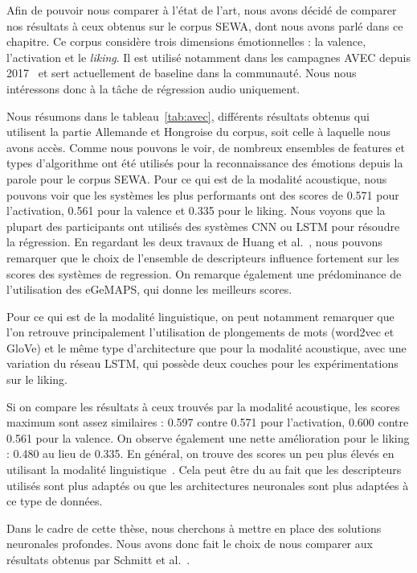 Afin de pouvoir nous comparer à l'état de l'art, nous avons décidé de comparer nos résultats à ceux obtenus sur le corpus SEWA, dont nous avons parlé dans ce chapitre.
Ce corpus considère trois dimensions émotionnelles : la valence, l'activation et le \textit{liking}. Il est utilisé notamment dans les campagnes AVEC depuis 2017~\cite{AVEC2017,AVEC2018,AVEC2019} et sert actuellement de baseline dans la communauté. Nous nous intéressons donc à la tâche de régression audio uniquement.

Nous résumons dans le tableau~\ref{tab:avec}, différents résultats obtenus qui utilisent la partie Allemande et Hongroise du corpus, soit celle à laquelle nous avons accès. Comme nous pouvons le voir, de nombreux ensembles de features et types d'algorithme ont été utilisés pour la reconnaissance des émotions depuis la parole pour le corpus SEWA.
Pour ce qui est de la modalité acoustique, nous pouvons voir que les systèmes les plus performants ont des scores de 0.571 pour l'activation, 0.561 pour la valence et 0.335 pour le liking. Nous voyons que la plupart des participants ont utilisés des systèmes CNN ou LSTM pour résoudre la régression. En regardant les deux travaux de Huang et al.~\cite{Huang2017,Huang2018}, nous pouvons remarquer que le choix de l'ensemble de descripteurs influence fortement sur les scores des systèmes de regression. On remarque également une prédominance de l'utilisation des eGeMAPS, qui donne les meilleurs scores.

Pour ce qui est de la modalité linguistique, on peut notamment remarquer que l'on retrouve principalement l'utilisation de plongements de mots (word2vec et GloVe) et le même type d'architecture que pour la modalité acoustique, avec une variation du réseau LSTM, qui possède deux couches pour les expérimentations sur le liking.

Si on compare les résultats à ceux trouvés par la modalité acoustique, les scores maximum sont assez similaires : 0.597 contre 0.571 pour l'activation, 0.600 contre 0.561 pour la valence. On observe également une nette amélioration pour le liking : 0.480 au lieu de 0.335. En général, on trouve des scores un peu plus élevés en utilisant la modalité linguistique~\cite{Gunes2013}. Cela peut être du au fait que les descripteurs utilisés sont plus adaptés ou que les architectures neuronales sont plus adaptées à ce type de données.

Dans le cadre de cette thèse, nous cherchons à mettre en place des solutions neuronales profondes. Nous avons donc fait le choix de nous comparer aux résultats obtenus par Schmitt et al.~\cite{Schmitt2019}.
%

